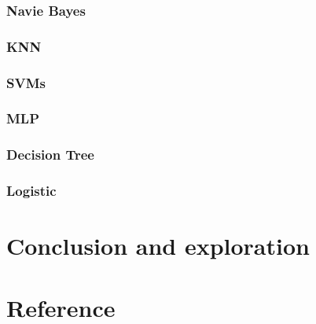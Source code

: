 \documentclass[12pt]{article}
\begin{document}
\subsubsection{Navie Bayes}


\subsubsection{KNN}


\subsubsection{SVMs}


\subsubsection{MLP}


\subsubsection{Decision Tree}


\subsubsection{Logistic}



\section{Conclusion and exploration}



\section{Reference}
\end{document}

